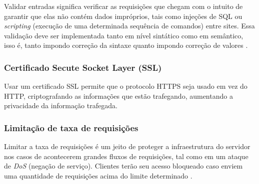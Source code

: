 Validar entradas significa verificar as requisições que chegam com o intuito de garantir que elas não contém dados impróprios, tais como injeções de SQL ou \emph{scripting} (execução de uma determinada sequência de comandos) entre sites. Essa validação deve ser implementada tanto em nível sintático como em semântico, isso é, tanto impondo correção da sintaxe quanto impondo correção de valores \cite{api-design-restfulapi}.

\subsubsection*{Certificado Secute Socket Layer (SSL)}
Usar um certificado SSL permite que o protocolo HTTPS seja usado em vez do HTTP, criptografando as informações que estão trafegando, aumentando a privacidade da informação trafegada. \cite{api-design-restfulapi}

\subsubsection*{Limitação de taxa de requisições}
Limitar a taxa de requisições é um jeito de proteger a infraestrutura do servidor nos casos de acontecerem grandes fluxos de requisições, tal como em um ataque de \emph{DoS} (negação de serviço). Clientes terão seu acesso bloqueado caso enviem uma quantidade de requisições acima do limite determinado \cite{api-design-restfulapi}.




